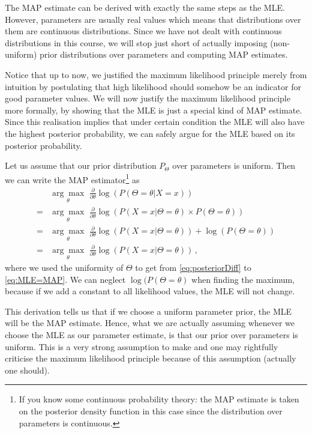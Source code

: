 The MAP estimate can be derived with exactly the same steps as the MLE. However, parameters are usually real values which means that distributions over them
are continuous distributions. Since we have not dealt with continuous distributions in this course, we will stop just short of actually imposing
(non-uniform) prior distributions over parameters and computing MAP estimates.

Notice that up to now, we justified the maximum likelihood principle merely from intuition by postulating that high likelihood should somehow be an indicator for
good parameter values. We will now justify the maximum likelihood principle more formally, by showing that the MLE is just a special kind of MAP estimate. Since
this realisation implies that under certain condition the MLE will also have the highest posterior probability, we can safely argue for the MLE based on its posterior probability.

Let us assume that our prior distribution $ P_{\Theta} $ over parameters is uniform. Then we can write the MAP estimator\footnote{If you know some continuous probability
theory: the MAP estimate is taken on the posterior density function in this case since the distribution over parameters is continuous.} as
\begin{align}
&\underset{\theta}{\arg\max}\, \, \frac{\partial}{\partial\theta} \log (P(\Theta = \theta| X=x)) \\
= &\underset{\theta}{\arg\max}\, \, \frac{\partial}{\partial\theta}\log (P(X=x|\Theta=\theta) \times P(\Theta = \theta)) \\
= &\underset{\theta}{\arg\max}\, \, \frac{\partial}{\partial\theta}\log (P(X=x|\Theta=\theta)) + \log(P(\Theta = \theta)) \label{eq:posteriorDiff} \\
= &\underset{\theta}{\arg\max}\, \, \frac{\partial}{\partial\theta}\log (P(X=x|\Theta=\theta)) \label{eq:MLE=MAP} \, ,
\end{align}
where we used the uniformity of $\Theta$ to get from \eqref{eq:posteriorDiff} to \eqref{eq:MLE=MAP}. We can neglect $ \log(P(\Theta = \theta) $ when finding the maximum, because if we add a constant to all likelihood values, the MLE will not change.

This derivation tells us that if we choose a uniform parameter prior, the MLE will be the MAP estimate. Hence, what we are actually assuming whenever we choose the MLE as
our parameter estimate, is that our prior over parameters is uniform. This is a very strong assumption to make and one may rightfully criticise the maximum likelihood principle because of this assumption (actually one should).

